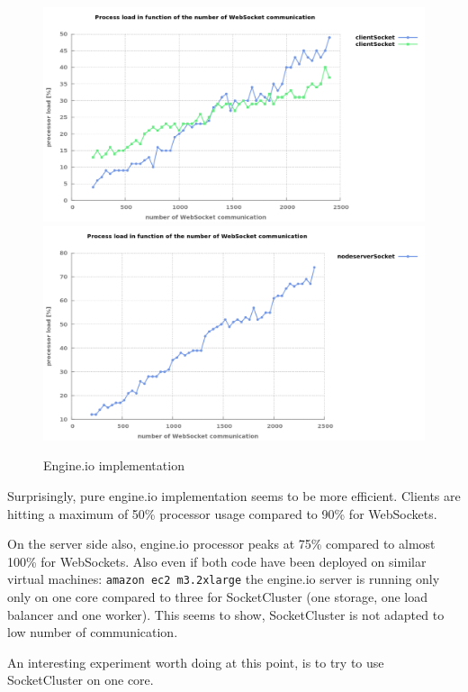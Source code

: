 \begin{figure}[H]
	\centering
		\includegraphics[width=\textwidth]{./Figures/engine_client_comparaison.png}
		\includegraphics[width=\textwidth]{./Figures/engine_server_comparaison.png}
	\caption[Engine.io implementation]{Engine.io implementation}
	\label{fig:engine_comparaison}
\end{figure}

Surprisingly, pure engine.io implementation seems to be more efficient. Clients
are hitting a maximum of 50\% processor usage compared to 90\% for WebSockets.

On the server side also, engine.io processor peaks at 75\% compared to almost
100\% for WebSockets. Also even if both code have been deployed on similar
virtual machines: \texttt{amazon ec2 m3.2xlarge} the engine.io server is
running only only on one core compared to three for SocketCluster (one storage,
one load balancer and one worker). This seems to show, SocketCluster is not
adapted to low number of communication.

An interesting experiment worth doing at this point, is to try to use
SocketCluster on one core.

